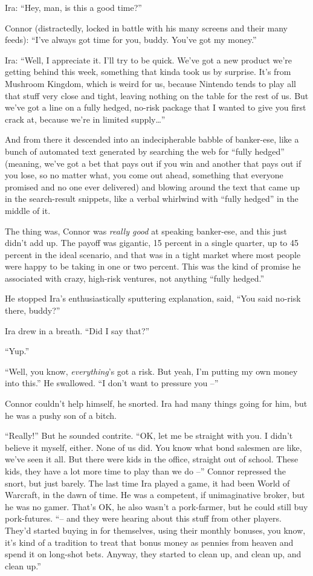 Ira: ``Hey, man, is this a good time?''

Connor (distractedly, locked in battle with his many screens and
their many feeds): ``I've always got time for you, buddy. You've got
my money.''

Ira: ``Well, I appreciate it. I'll try to be quick. We've got a new
product we're getting behind this week, something that kinda took
us by surprise. It's from Mushroom Kingdom, which is weird for us,
because Nintendo tends to play all that stuff very close and tight,
leaving nothing on the table for the rest of us. But we've got a
line on a fully hedged, no-risk package that I wanted to give you
first crack at, because we're in limited supply\ldots{}''

And from there it descended into an indecipherable babble of
banker-ese, like a bunch of automated text generated by searching
the web for ``fully hedged'' (meaning, we've got a bet that pays out
if you win and another that pays out if you lose, so no matter
what, you come out ahead, something that everyone promised and no
one ever delivered) and blowing around the text that came up in the
search-result snippets, like a verbal whirlwind with ``fully hedged''
in the middle of it.

The thing was, Connor was \emph{really good} at speaking
banker-ese, and this just didn't add up. The payoff was gigantic,
15 percent in a single quarter, up to 45 percent in the ideal
scenario, and that was in a tight market where most people were
happy to be taking in one or two percent. This was the kind of
promise he associated with crazy, high-risk ventures, not anything
``fully hedged.''

He stopped Ira's enthusiastically sputtering explanation, said,
``You said no-risk there, buddy?''

Ira drew in a breath. ``Did I say that?''

``Yup.''

``Well, you know, \emph{everything}'s got a risk. But yeah, I'm
putting my own money into this.'' He swallowed. ``I don't want to
pressure you --''

Connor couldn't help himself, he snorted. Ira had many things going
for him, but he was a pushy son of a bitch.

``Really!'' But he sounded contrite. ``OK, let me be straight with
you. I didn't believe it myself, either. None of us did. You know
what bond salesmen are like, we've seen it all. But there were kids
in the office, straight out of school. These kids, they have a lot
more time to play than we do --'' Connor repressed the snort, but
just barely. The last time Ira played a game, it had been World of
Warcraft, in the dawn of time. He was a competent, if unimaginative
broker, but he was no gamer. That's OK, he also wasn't a
pork-farmer, but he could still buy pork-futures. ``-- and they were
hearing about this stuff from other players. They'd started buying
in for themselves, using their monthly bonuses, you know, it's kind
of a tradition to treat that bonus money as pennies from heaven and
spend it on long-shot bets. Anyway, they started to clean up, and
clean up, and clean up.''

